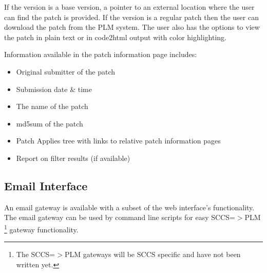 If the version is a base version, a pointer to an external location where the 
user can find the patch is provided.  If the version is a regular patch then 
the user can download the patch from the PLM system.  The user also has the 
options to view the patch in plain text or in code2html output with color 
highlighting.

Information available in the patch information page includes:

\begin{itemize}
\item Original submitter of the patch
\item Submission date \& time
\item The name of the patch
\item md5sum  of the patch
\item Patch Applies tree with links to relative patch information pages
\item Report on filter results (if available)
\end{itemize}

\begin{center}
\end{center}

\subsection{Email Interface}
An email gateway is available with a subset of the web interface's 
functionality. The email gateway can be used by command line scripts for easy 
SCCS=$>$PLM \footnote{The SCCS=$>$PLM gateways will be SCCS specific and have 
not been written yet.} gateway functionality.

